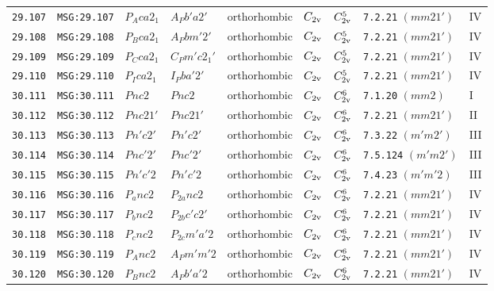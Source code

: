 \documentclass[fleqn,10pt]{jsarticle}
\begin{document}
\begin{center}
\begin{longtable}{lllllllll}
\texttt{29.107} & \texttt{MSG:29.107} & $P_{A}ca2_{1}$ & $A_{P}b'a2'$ & orthorhombic & $C_{\rm 2v}$ & $C_{\rm 2v}^{5}$ & \texttt{7.2.21} $(mm21')$ & IV \\
\texttt{29.108} & \texttt{MSG:29.108} & $P_{B}ca2_{1}$ & $A_{P}bm'2'$ & orthorhombic & $C_{\rm 2v}$ & $C_{\rm 2v}^{5}$ & \texttt{7.2.21} $(mm21')$ & IV \\
\texttt{29.109} & \texttt{MSG:29.109} & $P_{C}ca2_{1}$ & $C_{P}m'c2_{1}'$ & orthorhombic & $C_{\rm 2v}$ & $C_{\rm 2v}^{5}$ & \texttt{7.2.21} $(mm21')$ & IV \\
\texttt{29.110} & \texttt{MSG:29.110} & $P_{I}ca2_{1}$ & $I_{P}ba'2'$ & orthorhombic & $C_{\rm 2v}$ & $C_{\rm 2v}^{5}$ & \texttt{7.2.21} $(mm21')$ & IV \\ \hline
\texttt{30.111} & \texttt{MSG:30.111} & $Pnc2$ & $Pnc2$ & orthorhombic & $C_{\rm 2v}$ & $C_{\rm 2v}^{6}$ & \texttt{7.1.20} $(mm2)$ & I \\
\texttt{30.112} & \texttt{MSG:30.112} & $Pnc21'$ & $Pnc21'$ & orthorhombic & $C_{\rm 2v}$ & $C_{\rm 2v}^{6}$ & \texttt{7.2.21} $(mm21')$ & II \\
\texttt{30.113} & \texttt{MSG:30.113} & $Pn'c2'$ & $Pn'c2'$ & orthorhombic & $C_{\rm 2v}$ & $C_{\rm 2v}^{6}$ & \texttt{7.3.22} $(m'm2')$ & III \\
\texttt{30.114} & \texttt{MSG:30.114} & $Pnc'2'$ & $Pnc'2'$ & orthorhombic & $C_{\rm 2v}$ & $C_{\rm 2v}^{6}$ & \texttt{7.5.124} $(m'm2')$ & III \\
\texttt{30.115} & \texttt{MSG:30.115} & $Pn'c'2$ & $Pn'c'2$ & orthorhombic & $C_{\rm 2v}$ & $C_{\rm 2v}^{6}$ & \texttt{7.4.23} $(m'm'2)$ & III \\
\texttt{30.116} & \texttt{MSG:30.116} & $P_{a}nc2$ & $P_{2a}nc2$ & orthorhombic & $C_{\rm 2v}$ & $C_{\rm 2v}^{6}$ & \texttt{7.2.21} $(mm21')$ & IV \\
\texttt{30.117} & \texttt{MSG:30.117} & $P_{b}nc2$ & $P_{2b}c'c2'$ & orthorhombic & $C_{\rm 2v}$ & $C_{\rm 2v}^{6}$ & \texttt{7.2.21} $(mm21')$ & IV \\
\texttt{30.118} & \texttt{MSG:30.118} & $P_{c}nc2$ & $P_{2c}m'a'2$ & orthorhombic & $C_{\rm 2v}$ & $C_{\rm 2v}^{6}$ & \texttt{7.2.21} $(mm21')$ & IV \\
\texttt{30.119} & \texttt{MSG:30.119} & $P_{A}nc2$ & $A_{P}m'm'2$ & orthorhombic & $C_{\rm 2v}$ & $C_{\rm 2v}^{6}$ & \texttt{7.2.21} $(mm21')$ & IV \\
\texttt{30.120} & \texttt{MSG:30.120} & $P_{B}nc2$ & $A_{P}b'a'2$ & orthorhombic & $C_{\rm 2v}$ & $C_{\rm 2v}^{6}$ & \texttt{7.2.21} $(mm21')$ & IV \\

\end{longtable}
\end{center}
\end{document}
